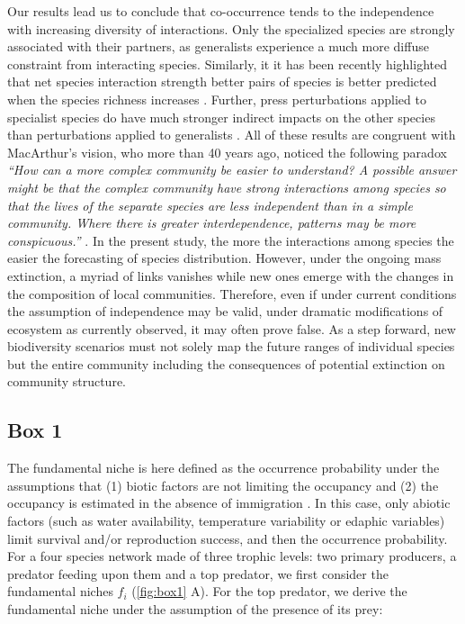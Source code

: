 Our results lead us to conclude that co-occurrence tends to the
independence with increasing diversity of interactions. Only the
specialized species are strongly associated with their partners, as
generalists experience a much more diffuse constraint from interacting
species. Similarly, it it has been recently highlighted that net species
interaction strength better pairs of species is better predicted when
the species richness increases \citep{Berlow2009}. Further, press
perturbations applied to specialist species do have much stronger
indirect impacts on the other species than perturbations applied to
generalists \citep{Montoya2009}. All of these results are congruent with
MacArthur's vision, who more than 40 years ago, noticed the following
paradox \emph{``How can a more complex community be easier to
understand? A possible answer might be that the complex community have
strong interactions among species so that the lives of the separate
species are less independent than in a simple community. Where there is
greater interdependence, patterns may be more conspicuous.''}
\citep[p.199]{macarthur1972geographical}. In the present study, the more
the interactions among species the easier the forecasting of species
distribution. However, under the ongoing mass extinction, a myriad of
links vanishes while new ones emerge with the changes in the composition
of local communities. Therefore, even if under current conditions the
assumption of independence may be valid, under dramatic modifications of
ecosystem as currently observed, it may often prove false. As a step
forward, new biodiversity scenarios must not solely map the future
ranges of individual species but the entire community including the
consequences of potential extinction on community structure.

\newpage

\subsection{Box 1}\label{box-1}

The fundamental niche is here defined as the occurrence probability
under the assumptions that (1) biotic factors are not limiting the
occupancy and (2) the occupancy is estimated in the absence of
immigration \citep{Godsoe2010a}. In this case, only abiotic factors
(such as water availability, temperature variability or edaphic
variables) limit survival and/or reproduction success, and then the
occurrence probability. For a four species network made of three trophic
levels: two primary producers, a predator feeding upon them and a top
predator, we first consider the fundamental niches \(f_i\)
(\ref{fig:box1} A). For the top predator, we derive the fundamental
niche under the assumption of the presence of its prey:

